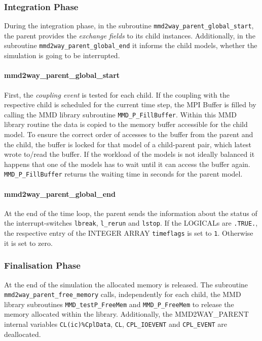 \documentclass[11pt,twoside]{article}
\begin{document}
\subsubsection{Integration Phase}
During the integration phase, in the
 subroutine \verb|mmd2way_parent_global_start|, 
 the parent provides the {\it exchange fields} to its
child instances. 
Additionally, in the subroutine \verb|mmd2way_parent_global_end| it informs 
the child models,
 whether the simulation is going to be interrupted.

\paragraph{\bf mmd2way\_parent\_global\_start\\}
First, the {\it coupling event} is tested for each child. If the 
coupling with the respective child is scheduled for the current time step,
 the MPI Buffer is filled by calling the MMD library subroutine 
\verb|MMD_P_FillBuffer|. 
Within this MMD library routine the data is copied to the memory buffer
accessible for the child model. To ensure the correct order of accesses to 
the buffer from the parent and the child, the buffer is locked for that
 model of a child-parent pair, which latest wrote to/read the buffer.
 If the workload of the models is not ideally balanced it happens that one of 
the models has to wait until it can access the buffer again.
\verb|MMD_P_FillBuffer| returns the waiting time in seconds for the parent
model.

\paragraph{\bf mmd2way\_parent\_global\_end\\}
At the end of the time loop, the parent sends the information about
the status of the interrupt-switches \verb|lbreak|, \verb|l_rerun|
and \verb|lstop|. If the {\footnotesize LOGICALs} are \verb|.TRUE.|, the 
respective entry of the {\footnotesize INTEGER ARRAY} \verb|timeflags| is set
to  \verb|1|. Otherwise it is set to zero.

\subsubsection{Finalisation Phase}
At the end of the simulation the allocated memory is released.
The subroutine \verb|mmd2way_parent_free_memory| calls, independently for each
child, the MMD library subroutines \verb|MMD_testP_FreeMem| and 
\verb|MMD_P_FreeMem| to release the memory allocated within the library.
Additionally, the MMD2WAY\_PARENT internal
variables \verb|CL(ic)%CplData|, \verb|CL|,  
\verb|CPL_IOEVENT| and \verb|CPL_EVENT| are deallocated.
\end{document}
